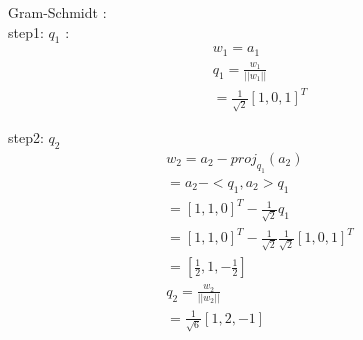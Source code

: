 \documentclass[12pt]{article}
\begin{document}
\begin{flushleft}
    Gram-Schmidt : \\
    step1: $q_{1}$ : \\
    \begin{align}
        w_{1} = a_{1}                   \\
        q_{1} = \frac{w_{1}}{||w_{1}||} \\
        =\frac{1}{\sqrt{2}}[1, 0, 1]^{T}
    \end{align}

    step2: $q_{2}$ \\
    \begin{align}
        w_{2} = a_{2} - proj_{q_{1}}(a_{2})                                 \\
        = a_{2} - <q_{1},a_{2}>q_{1}                                        \\
        = [1, 1, 0]^{T} - \frac{1}{\sqrt{2}}q_{1}                           \\
        = [1, 1, 0]^{T} - \frac{1}{\sqrt{2}}\frac{1}{\sqrt{2}}[1, 0, 1]^{T} \\
        = [\frac{1}{2},1, -\frac{1}{2}]                                     \\
        q_{2} =  \frac{w_{2}}{||w_{2}||}                                    \\
        = \frac{1}{\sqrt{6}}[1, 2, -1]                                      \\
    \end{align}


\end{flushleft}
\end{document}

